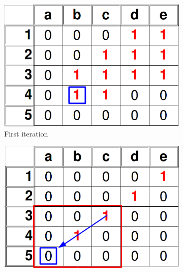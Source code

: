 \documentclass{article}
\begin{document}
\begin{figure}[htb!]
\begin{subfigure}{0.25\textwidth}
		\vspace{0.2cm}
		
		\includegraphics[width=\linewidth]{thick_DNA_2.png}
		\caption{First iteration}
		\label{fig:end_pixel_recovery2}
	\end{subfigure}
	\begin{subfigure}{0.25\textwidth}
		\includegraphics[width=\linewidth]{thin_DNA_4.png}
		
		\vspace{0.2cm}
		

\end{subfigure}
\end{figure}
\end{document}
